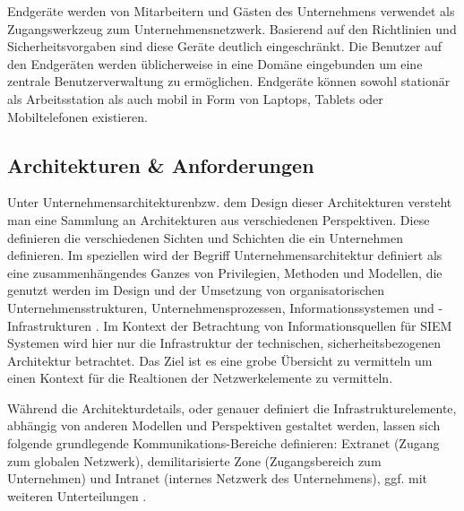 Endgeräte werden von Mitarbeitern und Gästen des Unternehmens verwendet als Zugangswerkzeug zum Unternehmensnetzwerk. Basierend auf den Richtlinien und Sicherheitsvorgaben sind diese Geräte deutlich eingeschränkt. Die Benutzer auf den Endgeräten werden üblicherweise in eine Domäne eingebunden um eine zentrale Benutzerverwaltung zu ermöglichen. Endgeräte können sowohl stationär als Arbeitsstation als auch mobil in Form von Laptops, Tablets oder Mobiltelefonen existieren. 


\subsection{Architekturen \&  Anforderungen}
Unter \glqq Unternehmensarchitekturen\grqq  bzw. dem Design dieser Architekturen versteht man eine Sammlung an Architekturen aus verschiedenen Perspektiven. Diese definieren die verschiedenen Sichten und Schichten die ein Unternehmen definieren. Im speziellen wird der Begriff Unternehmensarchitektur definiert als eine zusammenhängendes Ganzes von Privilegien, Methoden und Modellen, die genutzt werden im Design und der Umsetzung von organisatorischen Unternehmensstrukturen, Unternehmensprozessen, Informationssystemen und -Infrastrukturen \citep{Lankhorst2017}. %
Im Kontext der Betrachtung von Informationsquellen für SIEM Systemen wird hier nur die Infrastruktur der  technischen, sicherheitsbezogenen Architektur betrachtet. Das Ziel ist es eine grobe Übersicht zu vermitteln um einen Kontext für die Realtionen der Netzwerkelemente zu vermitteln.


Während die Architekturdetails, oder genauer definiert die Infrastrukturelemente, abhängig von anderen Modellen und Perspektiven gestaltet werden, lassen sich folgende grundlegende Kommunikations-Bereiche definieren: Extranet (Zugang zum globalen Netzwerk), demilitarisierte Zone (Zugangsbereich zum Unternehmen) und Intranet (internes Netzwerk des Unternehmens), ggf. mit weiteren Unterteilungen \cite{Stingley2015}. %

